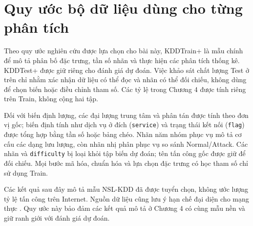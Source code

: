 \documentclass[../main.tex]{subfiles}
\begin{document}
\section{Quy ước bộ dữ liệu dùng cho từng phân tích}
Theo quy ước nghiên cứu được lựa chọn cho bài này, KDDTrain+ là mẫu chính để mô tả phân bố đặc trưng, tần số nhãn và thực hiện các phân tích thống kê. KDDTest+ được giữ riêng cho đánh giá dự đoán. Việc khảo sát chất lượng Test ở trên chỉ nhằm xác nhận dữ liệu có thể đọc và nhãn có thể đối chiếu, không dùng để chọn biến hoặc điều chỉnh tham số. Các tỷ lệ trong Chương 4 được tính riêng trên Train, không cộng hai tập.

Đối với biến định lượng, các đại lượng trung tâm và phân tán được tính theo đơn vị gốc; biến định tính như dịch vụ ở đích (\texttt{service}) và trạng thái kết nối (\texttt{flag}) được tổng hợp bằng tần số hoặc bảng chéo. Nhãn năm nhóm phục vụ mô tả cơ cấu các dạng lưu lượng, còn nhãn nhị phân phục vụ so sánh Normal/Attack. Các nhãn và \texttt{difficulty} bị loại khỏi tập biến dự đoán; tên tấn công gốc được giữ để đối chiếu. Mọi bước mã hóa, chuẩn hóa và lựa chọn đặc trưng có học tham số chỉ sử dụng Train.

Các kết quả sau đây mô tả mẫu NSL-KDD đã được tuyển chọn, không ước lượng tỷ lệ tấn công trên Internet. Nguồn dữ liệu cũng lưu ý hạn chế đại diện cho mạng thực \cite{task2_unb2009}. Quy ước này bảo đảm các kết quả mô tả ở Chương 4 có cùng mẫu nền và giữ ranh giới với đánh giá dự đoán.
\FloatBarrier
\end{document}
